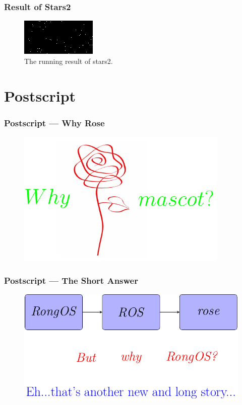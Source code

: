 \documentclass{beamer}
\begin{document}
\begin{frame}
  \frametitle{Result of Stars2}
  \begin{figure}
    \includegraphics[scale=2.4]{../thesis/figs/starts2.png}
    \caption{The running result of stars2.}
  \end{figure}
\end{frame}

\section{Postscript}

\begin{frame}
  \frametitle{Postscript — Why Rose}
  \begin{figure}
    \includegraphics[scale=1.8]{whyRose.pdf}
  \end{figure}
  
\end{frame}

\begin{frame}
  \frametitle{Postscript — The Short Answer}
  \begin{figure}
    \includegraphics[scale=.9]{answer.pdf}
  \end{figure}
  
\end{frame}
\end{document}
